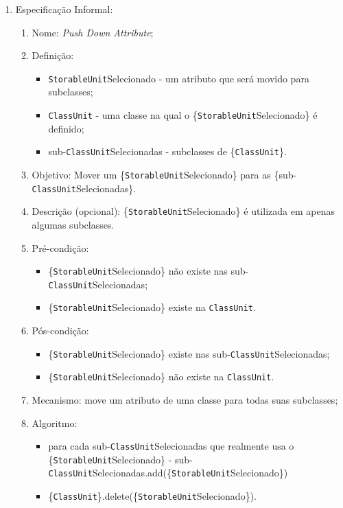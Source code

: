 \begin{enumerate}
	\item Especificação Informal:
		\begin{enumerate}
			\item Nome: \textit{Push Down Attribute};
			\item Definição:
			    \begin{itemize}
			        \item \texttt{StorableUnit}Selecionado - um atributo que será movido para subclasses;
			        \item \texttt{ClassUnit} - uma classe na qual o \{\texttt{StorableUnit}Selecionado\} é definido;
			        \item sub-\texttt{ClassUnit}Selecionadas - subclasses de \{\texttt{ClassUnit}\}.
			    \end{itemize}
			\item Objetivo: Mover um \{\texttt{StorableUnit}Selecionado\} para as \{sub-\texttt{ClassUnit}Selecionadas\}.
			\item Descrição (opcional): \{\texttt{StorableUnit}Selecionado\} é utilizada em apenas algumas subclasses.
			\item Pré-condição:
			    \begin{itemize}
			        \item \{\texttt{StorableUnit}Selecionado\} não existe nas sub-\texttt{ClassUnit}Selecionadas; 
			        \item \{\texttt{StorableUnit}Selecionado\} existe na \texttt{ClassUnit}. 
			    \end{itemize}
			\item Pós-condição:
			    \begin{itemize}
			        \item \{\texttt{StorableUnit}Selecionado\} existe nas sub-\texttt{ClassUnit}Selecionadas;
			        \item \{\texttt{StorableUnit}Selecionado\} não existe na \texttt{ClassUnit}.
			    \end{itemize}
			\item Mecanismo: move um atributo de uma classe para todas suas subclasses;
			\item Algoritmo: 
			    \begin{itemize}
			        \item para cada sub-\texttt{ClassUnit}Selecionadas que realmente usa o \{\texttt{StorableUnit}Selecionado\} - sub-\texttt{ClassUnit}Selecionadas.add(\{\texttt{StorableUnit}Selecionado\})
			        \item \{\texttt{ClassUnit}\}.delete(\{\texttt{StorableUnit}Selecionado\}). 

\end{itemize}
\end{enumerate}
\end{enumerate}
